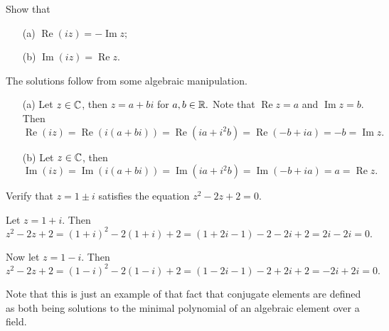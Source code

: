 \begin{problem}
    Show that 
    \begin{enumerate}
        \item[(a)] $\operatorname{Re}(iz)= - \operatorname{Im}z;$
        \item[(b)] $\operatorname{Im}(iz) = \operatorname{Re}z.$
    \end{enumerate}
\end{problem}
\begin{solution}
    The solutions follow from some algebraic manipulation. 
    \begin{enumerate}
        \item[(a)] Let $z \in \mathbb{C}$, then $z = a+bi$ for $a,b \in \mathbb{R}.$ Note that $\operatorname{Re}z=a$ and $\operatorname{Im}z = b.$ Then $\operatorname{Re}(iz) = \operatorname{Re}(i(a+bi))=\operatorname{Re}(ia+i^2b)=\operatorname{Re}(-b+ia)=-b=\operatorname{Im}z.$ 
        \item[(b)] Let $z \in \mathbb{C}$, then $\operatorname{Im}(iz)=\operatorname{Im}(i(a+bi))=\operatorname{Im}(ia+i^2b)=\operatorname{Im}(-b+ia)=a=\operatorname{Re}z.$
    \end{enumerate}
\end{solution}

\begin{problem}[Question 4]
    Verify that $z=1 \pm i$ satisfies the equation $z^2-2z+2=0.$
\end{problem}
\begin{solution}
    Let $z = 1+i.$ Then $z^2-2z+2=(1+i)^2-2(1+i)+2=(1+2i-1)-2-2i+2=2i-2i=0.$ 
    
    Now let $z=1-i.$ Then $z^2-2z+2=(1-i)^2-2(1-i)+2=(1-2i-1)-2+2i+2=-2i+2i=0.$

    Note that this is just an example of that fact that conjugate elements are defined as both being solutions to the minimal polynomial of an algebraic element over a field.
\end{solution}

